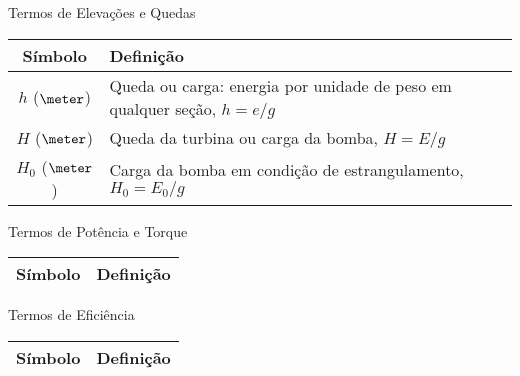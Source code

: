     \begin{frame}{Termos de Elevações e Quedas}\vspace*{-1em}
        \setlength{\tabcolsep}{2mm}
        \noindent\begin{longtable}{cp{110mm}}
            \alert{Símbolo} & \alert{Definição} \\
            \hline
            $h$ ($\meter$) &
            Queda ou carga: energia por unidade de peso em qualquer seção, \alert{$h = e/g$} \\
            $H$ ($\meter$) &
            Queda da turbina ou carga da bomba, \alert{$H = E/g$} \\
            $H_0$ ($\meter$) &
            Carga da bomba em condição de estrangulamento, \alert{$H_0 = E_0/g$} \\
            \hline
        \end{longtable}
    \end{frame}

    \begin{frame}{Termos de Potência e Torque}\vspace*{-1em}
        \setlength{\tabcolsep}{2mm}
        \noindent\begin{longtable}{cp{110mm}}
            \alert{Símbolo} & \alert{Definição} \\
            \hline
            \hline
        \end{longtable}
    \end{frame}

    \begin{frame}{Termos de Eficiência}\vspace*{-1em}
        \setlength{\tabcolsep}{2mm}
        \noindent\begin{longtable}{cp{110mm}}
            \alert{Símbolo} & \alert{Definição} \\
            \hline
            \hline
        \end{longtable}
    \end{frame}

